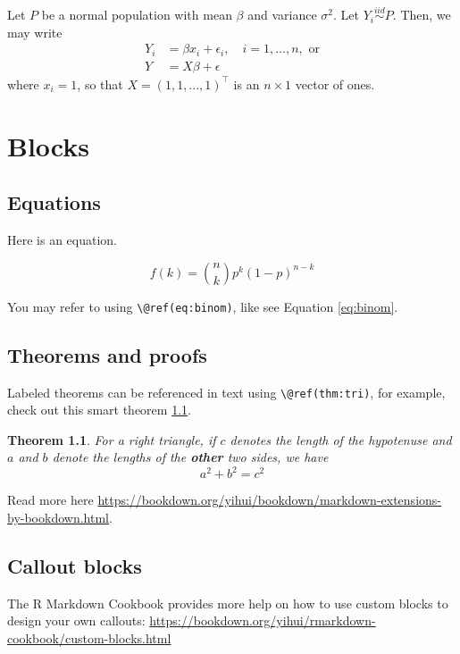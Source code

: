\documentclass[
]{book}
\newtheorem{theorem}{Theorem}[chapter]
\theoremstyle{definition}
\theoremstyle{definition}
\theoremstyle{definition}
\theoremstyle{definition}
\theoremstyle{remark}
\begin{document}
Let \(P\) be a normal population with mean \(\beta\) and variance \(\sigma^2\). Let \(Y_i\stackrel{iid}{\sim}P\). Then, we may write
\begin{equation}
\begin{aligned}
Y_i &= \beta x_i + \epsilon_i, \quad i = 1,\ldots, n, \,\,\text{or}\\
Y &= X\beta + \epsilon
\end{aligned}
\end{equation}
where \(x_i = 1\), so that \(X = (1, 1, ..., 1)^{\top}\) is an \(n\times 1\) vector of ones.

\hypertarget{blocks}{%
\chapter{Blocks}\label{blocks}}

\hypertarget{equations}{%
\section{Equations}\label{equations}}

Here is an equation.

\begin{equation} 
  f\left(k\right) = \binom{n}{k} p^k\left(1-p\right)^{n-k}
  \label{eq:binom}
\end{equation}

You may refer to using \texttt{\textbackslash{}@ref(eq:binom)}, like see Equation \eqref{eq:binom}.

\hypertarget{theorems-and-proofs}{%
\section{Theorems and proofs}\label{theorems-and-proofs}}

Labeled theorems can be referenced in text using \texttt{\textbackslash{}@ref(thm:tri)}, for example, check out this smart theorem \ref{thm:tri}.

\begin{theorem}
\protect\hypertarget{thm:tri}{}\label{thm:tri}For a right triangle, if \(c\) denotes the \emph{length} of the hypotenuse
and \(a\) and \(b\) denote the lengths of the \textbf{other} two sides, we have
\[a^2 + b^2 = c^2\]
\end{theorem}

Read more here \url{https://bookdown.org/yihui/bookdown/markdown-extensions-by-bookdown.html}.

\hypertarget{callout-blocks}{%
\section{Callout blocks}\label{callout-blocks}}

The R Markdown Cookbook provides more help on how to use custom blocks to design your own callouts: \url{https://bookdown.org/yihui/rmarkdown-cookbook/custom-blocks.html}

  
\end{document}
